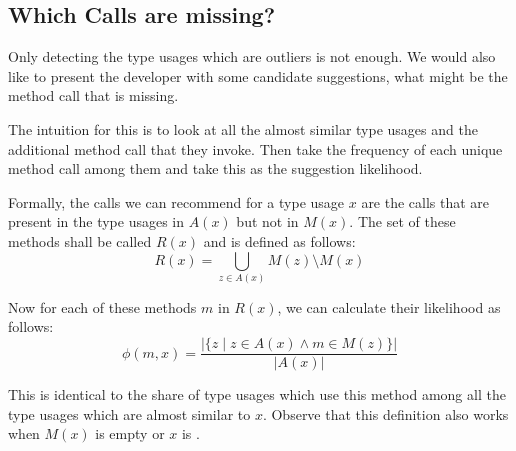 
\subsection{Which Calls are missing?}

Only detecting the type usages which are outliers is not enough.
We would also like to present the developer with some candidate suggestions, what might be the method call that is missing.

The intuition for this is to look at all the almost similar type usages and the additional method call that they invoke.
Then take the frequency of each unique method call among them and take this as the suggestion likelihood.

Formally, the calls we can recommend for a type usage $x$ are the calls that are present in the type usages in $A(x)$ but not in $M(x)$.
The set of these methods shall be called $R(x)$ and is defined as follows:
\begin{equation*}
    R(x) = \bigcup_{z \in A(x)} M(z) \setminus M(x)
\end{equation*}

Now for each of these methods $m$ in $R(x)$, we can calculate their likelihood as follows:
\begin{equation*}
    \phi(m, x) = \frac{|\{z \mid z \in A(x) \land m \in M(z)\}|}{|A(x)|}
\end{equation*}

This is identical to the share of type usages which use this method among all the type usages which are almost similar to $x$.
Observe that this definition also works when $M(x)$ is empty or $x$ is .

